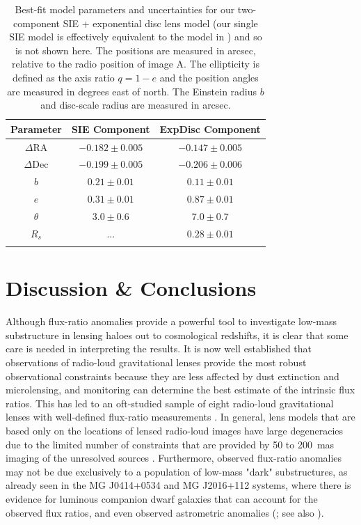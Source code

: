 \documentclass[a4paper,fleqn,usenatbib,useAMS]{mnras}
\begin{document}
\begin{table}
\centering
\caption{Best-fit model parameters and uncertainties for our two-component SIE + exponential disc lens model (our single SIE model is effectively equivalent to the model in \citet{Marlow99}) and so is not shown here. The positions are measured in arcsec, relative to the radio position of image A. The ellipticity is defined as the axis ratio $q=1-e$ and the position angles are measured in degrees east of north. The Einstein radius $b$ and disc-scale radius are measured in arcsec.}
\begin{tabular}{ccc}
\hline 
Parameter    & SIE Component & ExpDisc Component  \\
\hline
$\Delta$RA	& $-0.182 \pm 0.005$		& $-0.147 \pm 0.005$\\
$\Delta$Dec	& $-0.199 \pm 0.005$		& $-0.206 \pm 0.006$ \\
$b$ 			& $0.21 \pm 0.01$  		& $0.11 \pm 0.01$  \\
$e$	  		& $0.31 \pm 0.01$			& $0.87 \pm 0.01$ \\
$\theta$ 		& $3.0 \pm 0.6$			& $7.0 \pm 0.7$	 \\
$R_s$			& ...  						& $0.28 \pm 0.01$	 \\
\hline
\label{tab:model}
\end{tabular}
\end{table}


\section{Discussion \& Conclusions}

Although flux-ratio anomalies provide a powerful tool to investigate low-mass substructure in lensing haloes out to cosmological redshifts, it is clear that some care is needed in interpreting the results. It is now well established that observations of radio-loud gravitational lenses provide the most robust observational constraints because they are less affected by dust extinction and microlensing, and monitoring can determine the best estimate of the intrinsic flux ratios. This has led to an oft-studied sample of eight radio-loud gravitational lenses with well-defined flux-ratio measurements \citep{Dalal2002,KD04,Xu15}. In general, lens models that are based only on the locations of lensed radio-loud images have large degeneracies due to the limited number of constraints that are provided by 50 to 200~mas imaging of the unresolved sources \citep[e.g.][]{Ka91}. Furthermore, observed flux-ratio anomalies may not be due exclusively to a population of low-mass "dark" substructures, as already seen in the MG J0414+0534 and MG J2016+112 systems, where there is evidence for luminous companion dwarf galaxies that can account for the observed flux ratios, and even observed astrometric anomalies (\citealt{ros00,chen07,more09}; see also \citealt{mckean07,jackson10}). 
\end{document}
